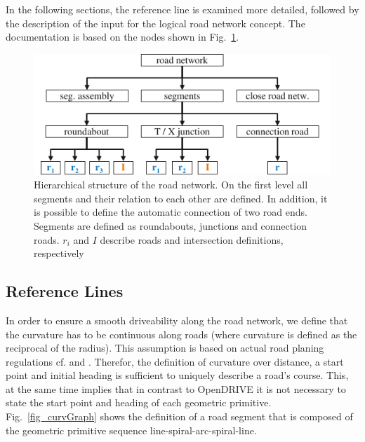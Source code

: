 \documentclass[a4paper, 10pt, conference]{ieeeconf}      %
\begin{document}
In the following sections, the reference line is examined more detailed, followed by the description of the input for the logical road network concept. The documentation is based on the nodes shown in Fig.~\ref{fig_schema}. 
\begin{figure}[thpb] 		
	\centering
	\includegraphics{fig/schema.pdf}
	\caption{Hierarchical structure of the road network. On the first level all segments and their relation to each other are defined. In addition, it is possible to define the automatic connection of two road ends. Segments are defined as roundabouts, junctions and connection roads. $r_i$ and $I$ describe roads and intersection definitions, respectively}
	\label{fig_schema}
\end{figure}
\subsection{Reference Lines} \label{sec_refline} %
In order to ensure a smooth driveability along the road network, we define that the curvature has to be continuous along roads (where curvature is defined as the reciprocal of the radius). This assumption is based on actual road planing regulations cf. \cite{Baier.2008} and \cite{StraenNRW.2019}. Therefor, the definition of curvature over distance, a start point and initial heading is sufficient to uniquely describe a road's course. This, at the same time implies that in contrast to OpenDRIVE it is not necessary to state the start point and heading of each geometric primitive. Fig.~\ref{fig_curvGraph} shows the definition of a road segment that is composed of the geometric primitive sequence line-spiral-arc-spiral-line.
\end{document}
